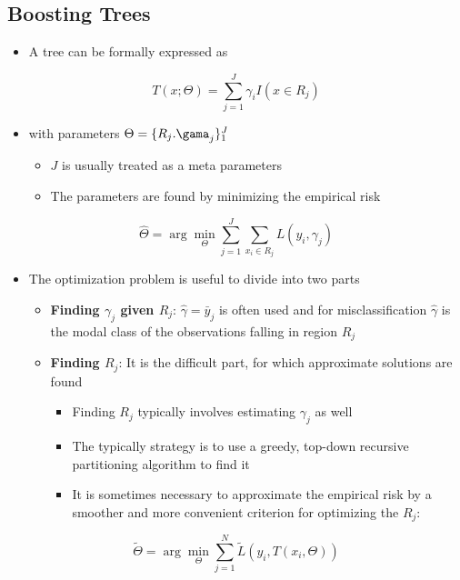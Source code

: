 \documentclass[11pt]{article}
\begin{document}
\subsection{Boosting Trees}
\label{sec:orgb8cc011}
\begin{itemize}
\item A tree can be formally expressed as
\end{itemize}
\begin{equation}
  T(x; \Theta) = \sum_{j=1}^J\gamma_iI(x \in R_j)
\end{equation}
\begin{itemize}
\item with parameters \(\Theta = \{R_j. \gama_j\}_1^J\)
\begin{itemize}
\item \(J\) is usually treated as a meta parameters
\item The parameters are found by minimizing the empirical risk
\end{itemize}
\end{itemize}
\begin{equation}
	\hat \Theta = \arg \min_\Theta \sum_{j=1}^J \sum_{x_i \in R_j} L(y_i, \gamma_j)
\end{equation}	
\begin{itemize}
\item The optimization problem is useful to divide into two parts
\begin{itemize}
\item \textbf{Finding \(\gamma_j\) given \(R_j\)}: \(\hat \gamma = \bar y_j\) is often used and for misclassification \(\hat \gamma\) is the modal class of the observations falling in region \(R_j\)
\item \textbf{Finding \(R_j\)}: It is the difficult part, for which approximate solutions are found
\begin{itemize}
\item Finding \(R_j\) typically involves estimating \(\gamma _j\) as well
\item The typically strategy is to use a greedy, top-down recursive partitioning algorithm to find it
\item It is sometimes necessary to approximate the empirical risk by a smoother and more convenient criterion for optimizing the \(R_j\):
\end{itemize}
\end{itemize}
\end{itemize}
\begin{equation}
	  \tilde \Theta = \arg \min_\Theta \sum_{j=1}^N \tilde L(y_i, T(x_i, \Theta))
\end{equation}	
\end{document}
